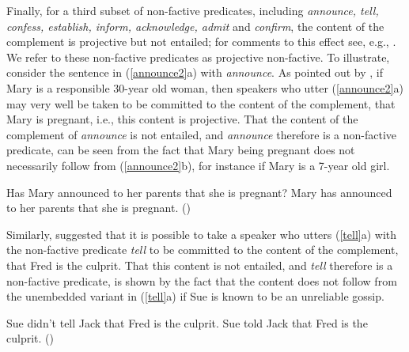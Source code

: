 \documentclass[11pt,fleqn]{article}
\newcommand{\6}{\mbox{$[\hspace*{-.6mm}[$}}
\newcommand{\9}{\mbox{$]\hspace*{-.6mm}]$}}
\begin{document}
%
%


Finally, for a third subset of non-factive predicates, including {\em announce, tell, confess, establish, inform, acknowledge, admit} and {\em confirm}, the content of the complement is projective but not entailed; for comments to this effect see, e.g., \citealt{reis1973,melvold1991,schultz2003,swanson2012,anand-hacquard2014,spector-egre2015,karttunen2016,tbd-variability}.  We refer to these non-factive predicates as projective non-factive. To illustrate, consider the sentence in (\ref{announce2}a) with {\em announce}. As pointed out by \citet[139]{schlenker10}, if Mary is a responsible 30-year old woman, then speakers who utter (\ref{announce2}a) may very well be taken to be committed to the content of the complement, that Mary is pregnant, i.e., this content is projective. That the content of the complement of {\em announce} is not entailed, and {\em announce} therefore is a non-factive predicate, can be seen from the fact that Mary being pregnant does not necessarily follow from (\ref{announce2}b), for instance if Mary is a 7-year old girl.

\begin{exe}
\ex\label{announce2} 
\begin{xlist}
\ex Has Mary announced to her parents that she is pregnant? 
\ex Mary has announced to her parents that she is pregnant. \hfill (\citealt[139]{schlenker10})
\end{xlist}
\end{exe}
Similarly, \citet{spector-egre2015} suggested that it is possible to take a speaker who utters (\ref{tell}a) with the non-factive predicate {\em tell}  to be committed to the content of the complement, that Fred is the culprit. That this content is not entailed, and {\em tell} therefore is a non-factive predicate, is shown by the fact that the content does not follow from the unembedded variant in (\ref{tell}a) if Sue is known to be an unreliable gossip.

\begin{exe}
\ex\label{tell}
\begin{xlist}
\ex Sue didn't tell Jack that Fred is the culprit. 
\ex Sue told Jack that Fred is the culprit. \hfill (\citealt[1739]{spector-egre2015})
\end{xlist}
\end{exe}
\end{document}
